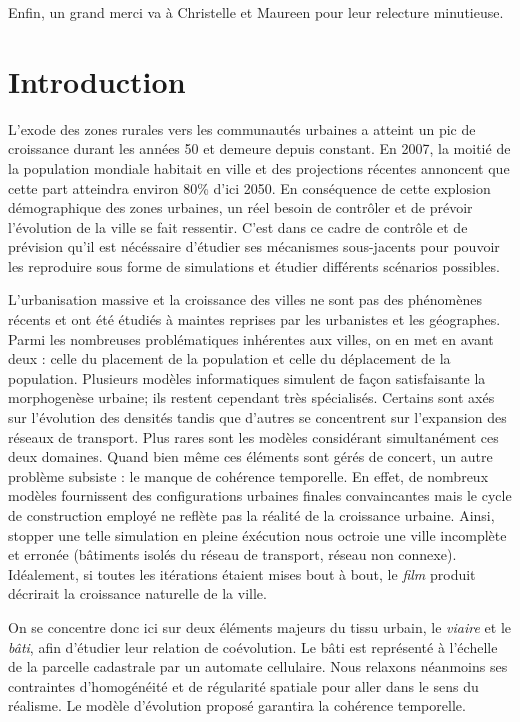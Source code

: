 \documentclass[10pt]{article}
\begin{document}
Enfin, un grand merci va à Christelle et Maureen pour leur relecture
minutieuse.

\newpage

\section{Introduction}

L'exode des zones rurales vers les communautés urbaines a atteint un
pic de croissance durant les années 50 et demeure depuis constant. En
2007, la moitié de la population mondiale habitait en ville et des
projections récentes annoncent que cette part atteindra environ 80\%
d'ici 2050. En conséquence de cette explosion démographique des zones
urbaines, un réel besoin de contrôler et de prévoir l'évolution de la
ville se fait ressentir. C'est dans ce cadre de contrôle et de
prévision qu'il est nécéssaire d'étudier ses mécanismes sous-jacents
pour pouvoir les reproduire sous forme de simulations et étudier
différents scénarios possibles.

L'urbanisation massive et la croissance des villes ne sont pas des
phénomènes récents et ont été étudiés à maintes reprises par les
urbanistes et les géographes. Parmi les nombreuses problématiques
inhérentes aux villes, on en met en avant deux : celle du placement de
la population et celle du déplacement de la population. Plusieurs
modèles informatiques simulent de façon satisfaisante la morphogenèse
urbaine; ils restent cependant très spécialisés. Certains sont axés
sur l'évolution des densités tandis que d'autres se concentrent sur
l'expansion des réseaux de transport. Plus rares sont les modèles
considérant simultanément ces deux domaines. Quand bien même ces
éléments sont gérés de concert, un autre problème subsiste : le manque
de cohérence temporelle. En effet, de nombreux modèles fournissent des
configurations urbaines finales convaincantes mais le cycle de
construction employé ne reflète pas la réalité de la croissance
urbaine. Ainsi, stopper une telle simulation en pleine éxécution nous
octroie une ville incomplète et erronée (bâtiments isolés du réseau de
transport, réseau non connexe). Idéalement, si toutes les itérations
étaient mises bout à bout, le \textit{film} produit décrirait la
croissance naturelle de la ville.

On se concentre donc ici sur deux éléments majeurs du tissu urbain, le
\textit{viaire} et le \textit{bâti}, afin d'étudier leur relation de
coévolution. Le bâti est représenté à l'échelle de la parcelle
cadastrale par un automate cellulaire. Nous relaxons néanmoins ses
contraintes d'homogénéité et de régularité spatiale pour aller dans le
sens du réalisme. Le modèle d'évolution proposé garantira la cohérence
temporelle.
\end{document}
